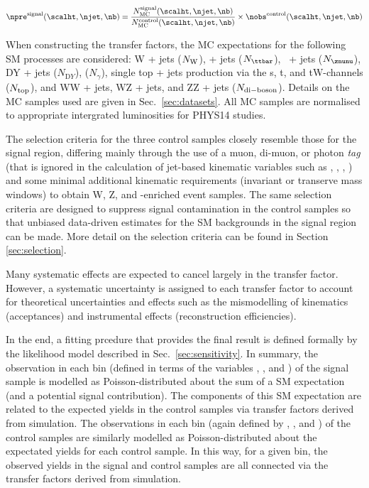 \begin{equation}
  \label{equ:pred-method}
  \npre^{\rm signal}(\scalht,\njet,\nb) = \frac{N_{\rm MC}^{\rm
      signal}(\scalht,\njet,\nb)}{N_{\rm MC}^{\rm
      control}(\scalht,\njet,\nb)} \times \nobs^{\rm
    control}(\scalht,\njet,\nb)   
\end{equation}

When constructing the transfer factors, the MC expectations for the
following SM processes are considered: W + jets ($N_{\rm W}$), \ttbar
+ jets ($N_{\ttbar}$), \znunu\ + jets ($N_{\znunu}$), DY + jets
($N_{\mathrm DY}$), \gj ($N_\gamma$), single top + jets production via
the s, t, and tW-channels ($N_{\rm top}$), and WW + jets, WZ + jets,
and ZZ + jets ($N_{\rm di-boson}$). Details on the MC samples used are
given in Sec.~\ref{sec:datasets}. All MC samples are normalised to
appropriate intergrated luminosities for PHYS14 studies.

The selection criteria for the three control samples closely resemble
those for the signal region, differing mainly through the use of a
muon, di-muon, or photon {\it tag} (that is ignored in the calculation
of jet-based kinematic variables such as \scalht, \mht, \alphat, \etc)
and some minimal additional kinematic requirements (\eg invariant or
transerve mass windows) to obtain W, Z, and \ttbar-enriched event
samples. The same selection criteria are designed to suppress signal
contamination in the control samples so that unbiased data-driven
estimates for the SM backgrounds in the signal region can be
made. More detail on the selection criteria can be found in Section
\ref{sec:selection}.

Many systematic effects are expected to cancel largely in the transfer
factor. However, a systematic uncertainty is assigned to each transfer
factor to account for theoretical uncertainties and effects such as
the mismodelling of kinematics (\eg acceptances) and instrumental
effects (\eg reconstruction efficiencies).

In the end, a fitting prcedure that provides the final result is
defined formally by the likelihood model described in
Sec.~\ref{sec:sensitivity}. In summary, the observation in each bin
(defined in terms of the variables \njet, \nb, and \scalht) of the
signal sample is modelled as Poisson-distributed about the sum of a SM
expectation (and a potential signal contribution). The components of
this SM expectation are related to the expected yields in the control
samples via transfer factors derived from simulation. The observations
in each bin (again defined by \njet, \nb, and \scalht) of the control
samples are similarly modelled as Poisson-distributed about the
expectated yields for each control sample. In this way, for a given
bin, the observed yields in the signal and control samples are all
connected via the transfer factors derived from simulation.
